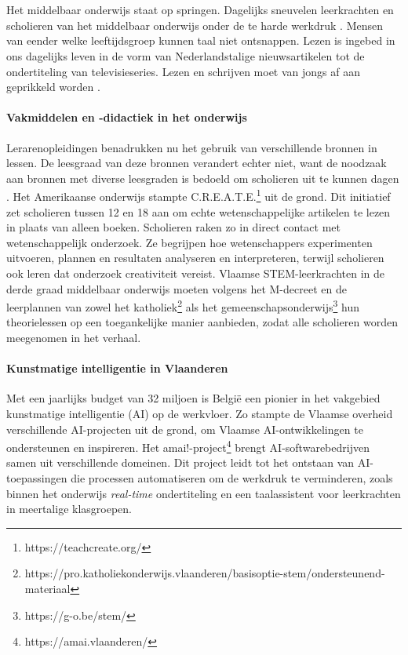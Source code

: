 
\chapter{}%
\label{ch:inleiding}


Het middelbaar onderwijs staat op springen. Dagelijks sneuvelen leerkrachten en scholieren van het middelbaar onderwijs onder de te harde werkdruk \autocite{Glorieux2018}. Mensen van eender welke leeftijdsgroep kunnen taal niet ontsnappen. Lezen is ingebed in ons dagelijks leven in de vorm van Nederlandstalige nieuwsartikelen tot de ondertiteling van televisieseries. Lezen en schrijven moet van jongs af aan geprikkeld worden \autocite{Daoud2023}.

\subsubsection{Vakmiddelen en -didactiek in het onderwijs}
Lerarenopleidingen benadrukken nu het gebruik van verschillende bronnen in lessen. De leesgraad van deze bronnen verandert echter niet, want de noodzaak aan bronnen met diverse leesgraden is bedoeld om scholieren uit te kunnen dagen \autocite{Surma2019}. Het Amerikaanse onderwijs stampte C.R.E.A.T.E.\footnote{https://teachcreate.org/} uit de grond. Dit initiatief zet scholieren tussen 12 en 18 aan om echte wetenschappelijke artikelen te lezen in plaats van alleen boeken. Scholieren raken zo in direct contact met wetenschappelijk onderzoek. Ze begrijpen hoe wetenschappers experimenten uitvoeren, plannen en resultaten analyseren en interpreteren, terwijl scholieren ook leren dat onderzoek creativiteit vereist. Vlaamse STEM-leerkrachten in de derde graad middelbaar onderwijs moeten volgens het M-decreet en de leerplannen van zowel het katholiek\footnote{https://pro.katholiekonderwijs.vlaanderen/basisoptie-stem/ondersteunend-materiaal} als het gemeenschapsonderwijs\footnote{https://g-o.be/stem/} hun theorielessen op een toegankelijke manier aanbieden, zodat alle scholieren worden meegenomen in het verhaal. 

\subsubsection{Kunstmatige intelligentie in Vlaanderen}
Met een jaarlijks budget van 32 miljoen is België een pionier \autocite{Crevits2022} in het vakgebied kunstmatige intelligentie (AI) op de werkvloer.  Zo stampte de Vlaamse overheid verschillende AI-projecten uit de grond, om Vlaamse AI-ontwikkelingen te ondersteunen en inspireren. Het amai!-project\footnote{https://amai.vlaanderen/}  brengt AI-softwarebedrijven samen uit verschillende domeinen. Dit project leidt tot het ontstaan van AI-toepassingen die processen automatiseren om de werkdruk te verminderen, zoals binnen het onderwijs \textit{real-time} ondertiteling en een taalassistent voor leerkrachten in meertalige klasgroepen.

